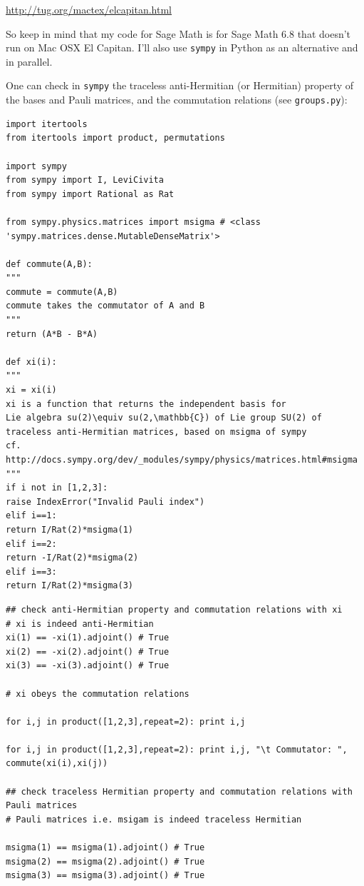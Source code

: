 \documentclass[10pt]{amsart}
\begin{document}
\begin{multicols*}{2}
\url{http://tug.org/mactex/elcapitan.html}

So keep in mind that my code for Sage Math is for Sage Math 6.8 that doesn't run on Mac OSX El Capitan.  I'll also use \verb|sympy| in Python as an alternative and in parallel.  

One can check in \verb|sympy| the traceless anti-Hermitian (or Hermitian) property of the bases and Pauli matrices, and the commutation relations (see \verb|groups.py|):

\begin{lstlisting}
import itertools
from itertools import product, permutations

import sympy
from sympy import I, LeviCivita
from sympy import Rational as Rat

from sympy.physics.matrices import msigma # <class 'sympy.matrices.dense.MutableDenseMatrix'>

def commute(A,B):
"""
commute = commute(A,B)
commute takes the commutator of A and B
"""
return (A*B - B*A)

def xi(i):
"""
xi = xi(i)
xi is a function that returns the independent basis for 
Lie algebra su(2)\equiv su(2,\mathbb{C}) of Lie group SU(2) of 
traceless anti-Hermitian matrices, based on msigma of sympy
cf. http://docs.sympy.org/dev/_modules/sympy/physics/matrices.html#msigma
"""
if i not in [1,2,3]:
raise IndexError("Invalid Pauli index")
elif i==1:
return I/Rat(2)*msigma(1)
elif i==2:
return -I/Rat(2)*msigma(2)
elif i==3:
return I/Rat(2)*msigma(3)

\end{lstlisting}

\begin{lstlisting}
## check anti-Hermitian property and commutation relations with xi 
# xi is indeed anti-Hermitian
xi(1) == -xi(1).adjoint() # True
xi(2) == -xi(2).adjoint() # True
xi(3) == -xi(3).adjoint() # True

# xi obeys the commutation relations

for i,j in product([1,2,3],repeat=2): print i,j

for i,j in product([1,2,3],repeat=2): print i,j, "\t Commutator: ", commute(xi(i),xi(j))

## check traceless Hermitian property and commutation relations with Pauli matrices
# Pauli matrices i.e. msigam is indeed traceless Hermitian

msigma(1) == msigma(1).adjoint() # True
msigma(2) == msigma(2).adjoint() # True
msigma(3) == msigma(3).adjoint() # True


\end{lstlisting}
\end{multicols*}
\end{document}
